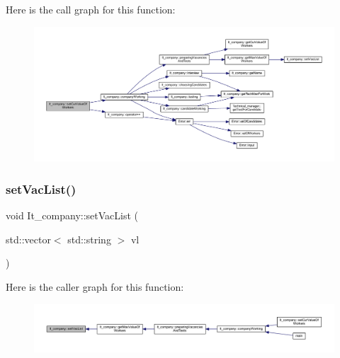 Here is the call graph for this function\+:
\nopagebreak
\begin{figure}[H]
\begin{center}
\leavevmode
\includegraphics[width=350pt]{class_it__company_ae06d651e9611d19f02bc1c7f29f2e988_cgraph}
\end{center}
\end{figure}
\hypertarget{class_it__company_a079be9a566c94860e31acdb0c2953536}{}\label{class_it__company_a079be9a566c94860e31acdb0c2953536} 
\subsubsection{\texorpdfstring{set\+Vac\+List()}{setVacList()}}
{\footnotesize\ttfamily void It\+\_\+company\+::set\+Vac\+List (\begin{DoxyParamCaption}\item[{std\+::vector$<$ std\+::string $>$}]{vl }\end{DoxyParamCaption})}

Here is the caller graph for this function\+:
\nopagebreak
\begin{figure}[H]
\begin{center}
\leavevmode
\includegraphics[width=350pt]{class_it__company_a079be9a566c94860e31acdb0c2953536_icgraph}
\end{center}
\end{figure}
\hypertarget{class_it__company_a2c7a94d7f82fb700c0d1f369423ad45f}{}\label{class_it__company_a2c7a94d7f82fb700c0d1f369423ad45f} 
